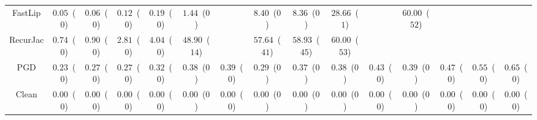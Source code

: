 \begin{table*}
{\begin{tabular}{c|c|c|c|c|c|c|c|c|c|c|c|c|c|c}
      FastLip &  $0.05$~($0$) &  $0.06$~($0$) &  $0.12$~($0$) &  $0.19$~($0$) &  $1.44$~($0$) &               &  $8.40$~($0$) &  $8.36$~($0$) & $28.66$~($1$) &               & $60.00$~($52$) &               &               &               \\
     RecurJac &  $0.74$~($0$) &  $0.90$~($0$) &  $2.81$~($0$) &  $4.04$~($0$) & $48.90$~($14$) &               & $57.64$~($41$) & $58.93$~($45$) & $60.00$~($53$) &               &               &               &               &               \\
\hline
          PGD &  $0.23$~($0$) &  $0.27$~($0$) &  $0.27$~($0$) &  $0.32$~($0$) &  $0.38$~($0$) &  $0.39$~($0$) &  $0.29$~($0$) &  $0.37$~($0$) &  $0.38$~($0$) &  $0.43$~($0$) &  $0.39$~($0$) &  $0.47$~($0$) &  $0.55$~($0$) &  $0.65$~($0$) \\
\hline
        Clean &  $0.00$~($0$) &  $0.00$~($0$) &  $0.00$~($0$) &  $0.00$~($0$) &  $0.00$~($0$) &  $0.00$~($0$) &  $0.00$~($0$) &  $0.00$~($0$) &  $0.00$~($0$) &  $0.00$~($0$) &  $0.00$~($0$) &  $0.00$~($0$) &  $0.00$~($0$) &  $0.00$~($0$) \\

    \bottomrule
    \end{tabular}
    }
    \label{table:exp-A-robust-accuracy-time-cifar10-8}
\end{table*}
        
